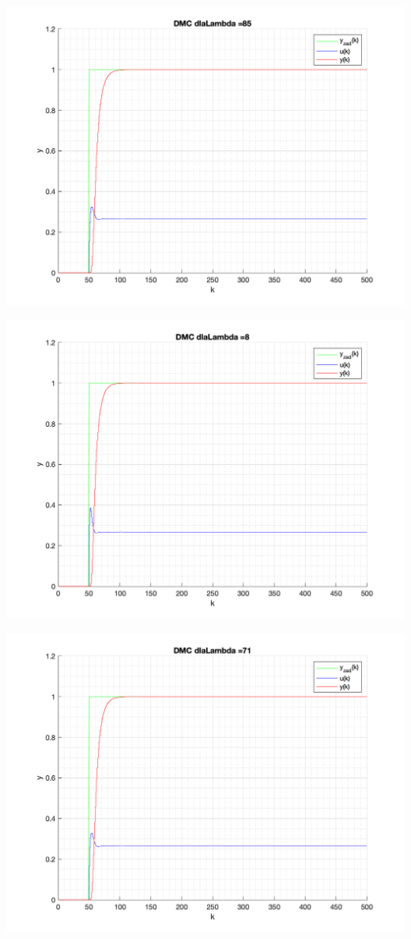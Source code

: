 \documentclass[a4paper, 11pt]{article}
\begin{document}
\begin{enumerate}
 \includegraphics[width=\linewidth]{./ModelsP4_Lambda/P4_DMC_Lambda_85_png.png} 
 
 \includegraphics[width=\linewidth]{./ModelsP4_Lambda/P4_DMC_Lambda_8_png.png} 
 
 \includegraphics[width=\linewidth]{./ModelsP4_Lambda/P4_DMC_Lambda_71_png.png} 
 

\end{enumerate}
\end{document}
